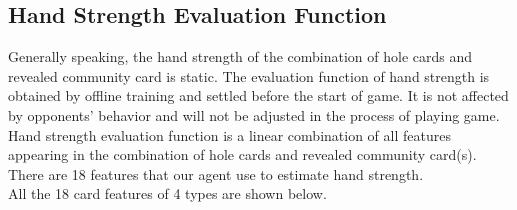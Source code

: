 \documentclass{article}
\begin{document}
\subsection{Hand Strength Evaluation Function}
Generally speaking, the hand strength of the combination of hole cards and revealed community card is static. The evaluation function of hand strength is obtained by offline training and settled before the start of game. It is not affected by opponents’  behavior and will not be adjusted in the process of playing game.                       
Hand strength evaluation function is a linear combination of all features appearing in the combination of hole cards and revealed community card(s). There are 18 features that our agent use to estimate hand strength. 
\\All the 18 card features of 4 types are shown below.
\end{document}
